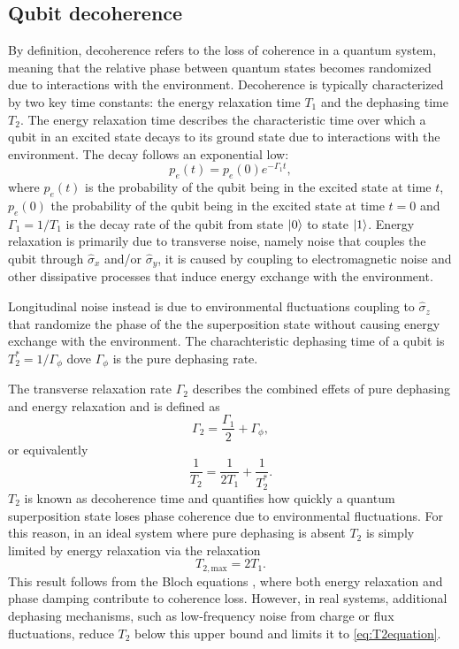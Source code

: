\subsection{Qubit decoherence}\label{subsec:qubit_decoherence}
By definition, decoherence refers to the loss of coherence in a quantum system, meaning that the relative phase between quantum states becomes randomized due to interactions with the environment. 
Decoherence is typically characterized by two key time constants: the energy relaxation time $T_1$ and the dephasing time $T_2$. 
The energy relaxation time  describes the characteristic time over which a qubit in an excited state decays to its ground state due to interactions with the environment. The decay follows an exponential low:
\begin{equation}\label{eq:gamma1}
    p_e(t) = p_e(0) e^{-\Gamma_1 t},
\end{equation}
where $p_e(t)$ is the probability of the qubit being in the excited state at time $t$, $p_e(0)$ the probability of the qubit being in the excited state at time $t=0$ and $\Gamma_1=1/T_1$ is the decay rate of the qubit from state $\ket{0}$ to state $\ket{1}$.
Energy relaxation is primarily due to transverse noise, namely noise that couples the qubit through $\hat{\sigma}_x$ and/or $\hat{\sigma}_y$, it is caused by coupling to electromagnetic noise and other dissipative processes that induce energy exchange with the environment.

Longitudinal noise instead is due to environmental fluctuations coupling to $\hat{\sigma}_z$ that randomize the phase of the the superposition state without causing energy exchange with the environment.
The charachteristic dephasing time of a qubit is $T_2^* = 1/\Gamma_\phi$ dove $\Gamma_\phi$ is the pure dephasing rate.

The transverse relaxation rate $\Gamma_2$ describes the combined effets of pure dephasing and energy relaxation and is defined as 
\begin{equation}\label{eq:gamma2}
    \Gamma_2 = \frac{\Gamma_1}{2} + \Gamma_\phi,
\end{equation}
or equivalently
\begin{equation}\label{eq:T2equation}
    \frac{1}{T_2} = \frac{1}{2T_1} + \frac{1}{T_2^*}.
\end{equation}
$T_2$ is known as decoherence time and quantifies how quickly a quantum superposition state loses phase coherence due to environmental fluctuations. 
For this reason, in an ideal system where pure dephasing is absent $T_2$ is simply limited by energy relaxation via the relaxation\begin{equation}\label{eq:T2max}
    T_{2,\text{max}} = 2T_1.
\end{equation}
This result follows from the Bloch equations \cite{krantz_quantum_2019}, where both energy relaxation and phase damping contribute to coherence loss. 
However, in real systems, additional dephasing mechanisms, such as low-frequency noise from charge or flux fluctuations, reduce $T_2$ below this upper bound and limits it to \ref{eq:T2equation}.

